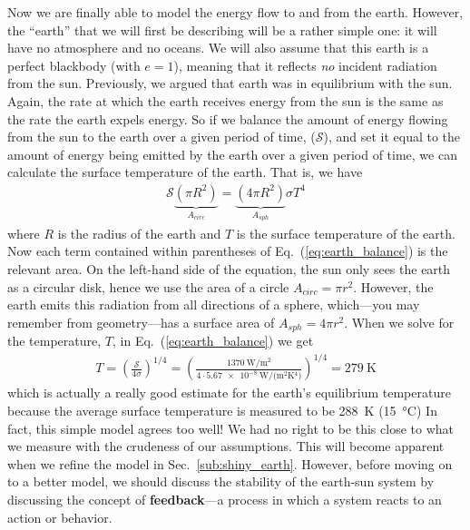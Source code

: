     Now we are finally able to model the energy flow to and from the earth. However, the ``earth'' that we will first be describing will be a rather simple one: it will have no atmosphere and no oceans. We will also assume that this earth is a perfect blackbody (with $e =1$), meaning that it reflects \emph{no} incident radiation from the sun. Previously, we argued that earth was in equilibrium with the sun. Again, the rate at which the earth receives energy from the sun is the same as the rate the earth expels energy. So if we balance the amount of energy flowing from the sun to the earth over a given period of time, ($\mathcal{S}$), and set it equal to the amount of energy being emitted by the earth over a given period of time, we can calculate the surface temperature of the earth. That is, we have
    \begin{align}
        \mathcal{S}\underbrace{(\pi R^2)}_{A_{circ}} = \underbrace{(4\pi R^2)}_{A_{sph}} \sigma T^4
        \label{eq:earth_balance}
    \end{align}
    where $R$ is the radius of the earth and $T$ is the surface temperature of the earth. Now each term contained within parentheses of Eq.~(\ref{eq:earth_balance}) is the relevant area. On the left-hand side of the equation, the sun only sees the earth as a circular disk, hence we use the area of a circle $A_{circ} = \pi r^2$. However, the earth emits this radiation from all directions of a sphere, which---you may remember from geometry---has a surface area of $A_{sph} = 4 \pi r^2$. When we solve for the temperature, $T$, in Eq.~(\ref{eq:earth_balance}) we get 
    \begin{align}
        T = \left( \frac{\mathcal{S}}{4 \sigma} \right)^{1/4} = \left( \frac{\SI{1370}{\watt/\meter^2}}{4 \cdot \SI{5.67e-8}{\watt/(\meter^2 \kelvin^4)} } \right)^{1/4} = \SI{279}{\kelvin}
        \label{eq:earth_temp}
    \end{align}
    which is actually a really good estimate for the earth's equilibrium temperature because the average surface temperature is measured to be \SI{288}{\kelvin} (\SI{15}{\celsius}) \citep{schroeder1999introduction} In fact, this simple model agrees too well! We had no right to be this close to what we measure with the crudeness of our assumptions. This will become apparent when we refine the model in Sec.~\ref{sub:shiny_earth}. However, before moving on to a better model, we should discuss the stability of the earth-sun system by discussing the concept of \textbf{feedback}---a process in which a system reacts to an action or behavior.



